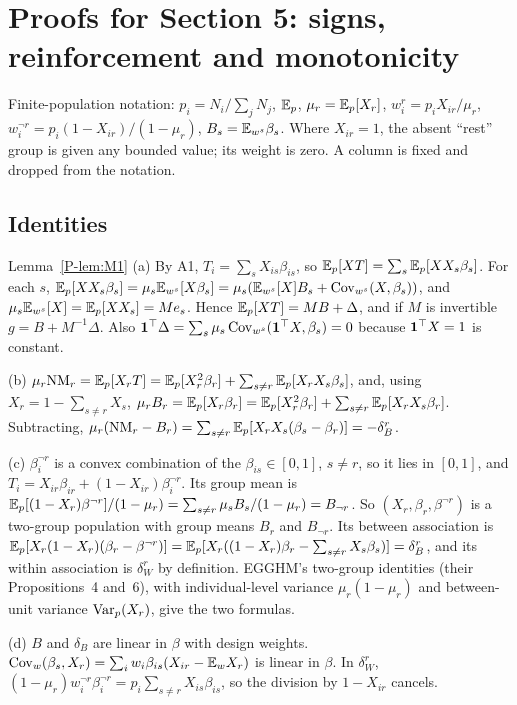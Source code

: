 \section{Proofs for Section 5: signs, reinforcement and monotonicity}\label{sec:proofs-signs}

Finite-population notation: $p_i=N_i/\sum_jN_j$, $\mathbb E_p$, $\mu_r=\mathbb E_p[X_r]$,
$w^r_i=p_iX_{ir}/\mu_r$, $w^{\neg r}_i=p_i(1-X_{ir})/(1-\mu_r)$, $B_s=\mathbb E_{w^s}\beta_s$.
Where $X_{ir}=1$, the absent ``rest'' group is given any bounded value; its weight is
zero. A column is fixed and dropped from the notation.

\subsection{Identities}

\begin{proofof}{Lemma~\ref{P-lem:M1}}
(a) By A1, $T_i=\sum_sX_{is}\beta_{is}$, so $\mathbb E_p[XT]=\sum_s\mathbb E_p[XX_s\beta_s]$. For each
$s$, $\mathbb E_p[XX_s\beta_s]=\mu_s\mathbb E_{w^s}[X\beta_s]=\mu_s(\mathbb E_{w^s}[X]B_s+\operatorname{Cov}_{w^s}(X,\beta_s))$,
and $\mu_s\mathbb E_{w^s}[X]=\mathbb E_p[XX_s]=Me_s$. Hence $\mathbb E_p[XT]=MB+\Delta$, and if $M$ is
invertible $g=B+M^{-1}\Delta$. Also
$\mathbf 1^\top\Delta=\sum_s\mu_s\operatorname{Cov}_{w^s}(\mathbf 1^\top X,\beta_s)=0$ because $\mathbf 1^\top X=1$ is
constant.

(b) $\mu_r\mathrm{NM}_r=\mathbb E_p[X_rT]=\mathbb E_p[X_r^2\beta_r]+\sum_{s\ne r}\mathbb E_p[X_rX_s\beta_s]$, and,
using $X_r=1-\sum_{s\ne r}X_s$,
$\mu_rB_r=\mathbb E_p[X_r\beta_r]=\mathbb E_p[X_r^2\beta_r]+\sum_{s\ne r}\mathbb E_p[X_rX_s\beta_r]$.
Subtracting, $\mu_r(\mathrm{NM}_r-B_r)=\sum_{s\ne r}\mathbb E_p[X_rX_s(\beta_s-\beta_r)]=-\delta^r_B$.

(c) $\beta^{\neg r}_i$ is a convex combination of the $\beta_{is}\in[0,1]$, $s\ne r$, so it
lies in $[0,1]$, and $T_i=X_{ir}\beta_{ir}+(1-X_{ir})\beta^{\neg r}_i$. Its group mean is
$\mathbb E_p[(1-X_r)\beta^{\neg r}]/(1-\mu_r)=\sum_{s\ne r}\mu_sB_s/(1-\mu_r)=B_{\neg r}$. So
$(X_r,\beta_r,\beta^{\neg r})$ is a two-group population with group means $B_r$ and
$B_{\neg r}$. Its between association is
$\mathbb E_p[X_r(1-X_r)(\beta_r-\beta^{\neg r})]=\mathbb E_p[X_r((1-X_r)\beta_r-\sum_{s\ne r}X_s\beta_s)]=\delta^r_B$,
and its within association is $\delta^r_W$ by definition. EGGHM's two-group identities
(their Propositions~4 and~6), with individual-level variance $\mu_r(1-\mu_r)$ and
between-unit variance $\operatorname{Var}_p(X_r)$, give the two formulas.

(d) $B$ and $\delta_B$ are linear in $\beta$ with design weights.
$\operatorname{Cov}_w(\beta_s,X_r)=\sum_iw_i\beta_{is}(X_{ir}-\mathbb E_wX_r)$ is linear in $\beta$. In
$\delta^r_W$, $(1-\mu_r)w^{\neg r}_i\beta^{\neg r}_i=p_i\sum_{s\ne r}X_{is}\beta_{is}$, so the
division by $1-X_{ir}$ cancels.
\end{proofof}

